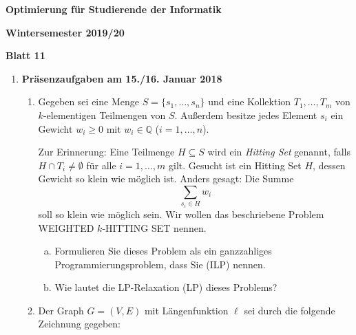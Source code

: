 \documentclass[11pt, a4paper]{article}
\begin{document}
\begin{center}
\begin{Large}
\textbf{Optimierung für Studierende der Informatik}
\end{Large}

\textbf{}
	
\vspace{0.5cm}

\textbf{Wintersemester 2019/20}

\textbf{Blatt 11}

\vspace{0.5cm}
\end{center}

\small

\begin{enumerate}[\bfseries A:]


\item \textbf{Präsenzaufgaben am 15./16. Januar 2018}

\begin{enumerate}[\bfseries 1.]


\item Gegeben sei eine Menge $S = \bigl\{ s_1,\ldots,s_n \bigr\}$ und eine Kollektion $T_1,\ldots,T_m$ von $k$-elementigen Teilmengen von $S$. Außerdem besitze jedes Element $s_i$ ein Gewicht $w_i \geq 0$ mit $w_i \in \mathbb{Q}$ ($i=1,\ldots,n$).

Zur Erinnerung: Eine Teilmenge $H \subseteq S$ wird ein \textit{Hitting Set} genannt, falls $H \cap T_i \neq \emptyset$ für alle $i=1,\ldots,m$ gilt. Gesucht ist ein Hitting Set $H$, dessen Gewicht so klein wie möglich ist. Anders gesagt: Die Summe
\[
\sum\limits_{s_i \in H}{w_i}
\]
soll so klein wie möglich sein. Wir wollen das beschriebene Problem WEIGHTED $k$-HITTING SET nennen.

\begin{enumerate}[a)]
\item Formulieren Sie dieses Problem als ein ganzzahliges Programmierungsproblem, dass Sie (ILP) nennen.
\item Wie lautet die LP-Relaxation (LP) dieses Problems?
\end{enumerate}



\item Der Graph $G = (V,E)$ mit Längenfunktion $\ell$ sei durch die folgende Zeichnung gegeben:


\end{enumerate}
\end{enumerate}
\end{document}
